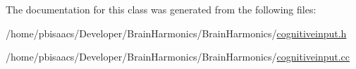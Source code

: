 The documentation for this class was generated from the following files\+:\begin{DoxyCompactItemize}
\item 
/home/pbisaacs/\+Developer/\+Brain\+Harmonics/\+Brain\+Harmonics/\mbox{\hyperlink{cognitiveinput_8h}{cognitiveinput.\+h}}\item 
/home/pbisaacs/\+Developer/\+Brain\+Harmonics/\+Brain\+Harmonics/\mbox{\hyperlink{cognitiveinput_8cc}{cognitiveinput.\+cc}}\end{DoxyCompactItemize}
